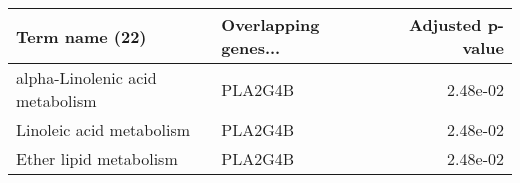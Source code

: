 \begin{tabular}{llr}
\toprule
                 Term name (22) & Overlapping genes... &  Adjusted p-value \\
\midrule
alpha-Linolenic acid metabolism &              PLA2G4B &          2.48e-02 \\
       Linoleic acid metabolism &              PLA2G4B &          2.48e-02 \\
         Ether lipid metabolism &              PLA2G4B &          2.48e-02 \\
\bottomrule
\end{tabular}
